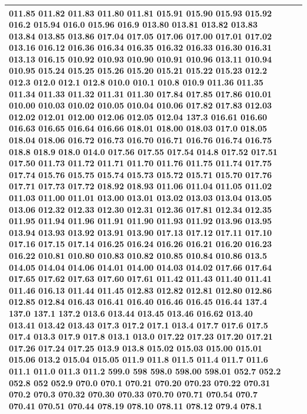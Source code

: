 \documentclass[3p,super,numbers,sort&compress,preprint,10pt]{elsarticle}
\begin{document}
\begin{longtable}{|L{.1in}|L{.6in}||L{5.65in}|}
011.85 011.82 011.83 011.80 011.81 015.91 015.90 015.93 015.92 016.2 015.94 016.0 015.96 016.9 013.80 013.81 013.82 013.83 013.84 013.85 013.86 017.04 017.05 017.06 017.00 017.01 017.02 013.16 016.12 016.36 016.34 016.35 016.32 016.33 016.30 016.31 013.13 016.15 010.92 010.93 010.90 010.91 010.96 013.11 010.94 010.95 015.24 015.25 015.26 015.20 015.21 015.22 015.23 012.2 012.3 012.0 012.1 012.8 010.0 010.1 010.8 010.9 011.36 011.35 011.34 011.33 011.32 011.31 011.30 017.84 017.85 017.86 010.01 010.00 010.03 010.02 010.05 010.04 010.06 017.82 017.83 012.03 012.02 012.01 012.00 012.06 012.05 012.04 137.3 016.61 016.60 016.63 016.65 016.64 016.66 018.01 018.00 018.03 017.0 018.05 018.04 018.06 016.72 016.73 016.70 016.71 016.76 016.74 016.75 018.8 018.9 018.0 014.0 017.56 017.55 017.54 014.8 017.52 017.51 017.50 011.73 011.72 011.71 011.70 011.76 011.75 011.74 017.75 017.74 015.76 015.75 015.74 015.73 015.72 015.71 015.70 017.76 017.71 017.73 017.72 018.92 018.93 011.06 011.04 011.05 011.02 011.03 011.00 011.01 013.00 013.01 013.02 013.03 013.04 013.05 013.06 012.32 012.33 012.30 012.31 012.36 017.81 012.34 012.35 011.95 011.94 011.96 011.91 011.90 011.93 011.92 013.96 013.95 013.94 013.93 013.92 013.91 013.90 017.13 017.12 017.11 017.10 017.16 017.15 017.14 016.25 016.24 016.26 016.21 016.20 016.23 016.22 010.81 010.80 010.83 010.82 010.85 010.84 010.86 013.5 014.05 014.04 014.06 014.01 014.00 014.03 014.02 017.66 017.64 017.65 017.62 017.63 017.60 017.61 011.42 011.43 011.40 011.41 011.46 016.13 011.44 011.45 012.83 012.82 012.81 012.80 012.86 012.85 012.84 016.43 016.41 016.40 016.46 016.45 016.44 137.4 137.0 137.1 137.2 013.6 013.44 013.45 013.46 016.62 013.40 013.41 013.42 013.43 017.3 017.2 017.1 013.4 017.7 017.6 017.5 017.4 013.3 017.9 017.8 013.1 013.0 017.22 017.23 017.20 017.21 017.26 017.24 017.25 013.9 013.8 015.02 015.03 015.00 015.01 015.06 013.2 015.04 015.05 011.9 011.8 011.5 011.4 011.7 011.6 011.1 011.0 011.3 011.2 599.0 598 598.0 598.00 598.01 052.7 052.2 052.8 052 052.9 070.0 070.1 070.21 070.20 070.23 070.22 070.31 070.2 070.3 070.32 070.30 070.33 070.70 070.71 070.54 070.7 070.41 070.51 070.44 078.19 078.10 078.11 078.12 079.4 078.1
  \\\hline

\end{longtable}
\end{document}
